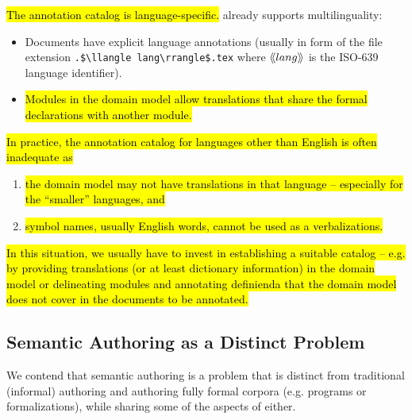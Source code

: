 \documentclass[runningheads]{llncs}
\def\edited#1{\hl{#1}}
\def\llangle{\langle\kern-.2em\langle}
\def\rrangle{\rangle\kern-.2em\rangle}
\begin{document}
\edited{The annotation catalog is language-specific.}
\sTeX already supports multilinguality:
\begin{itemize}
\item Documents have explicit language annotations (usually in form of the file extension
  \lstinline[mathescape]|.$\llangle lang\rrangle$.tex| where $\llangle lang\rrangle$ is the
  ISO-639 language identifier).
\item \edited{Modules in the domain model allow translations that share the formal
    declarations with another module.}
\end{itemize}
\edited{In practice, the annotation catalog for languages other than English is often inadequate as}
\begin{enumerate}[\em i\rm)]
    \item \edited{the domain model may not have translations in that language -- especially for the ``smaller'' languages, and}
    \item \edited{symbol names, usually English words, cannot be used as a verbalizations.}
\end{enumerate}
\edited{In this situation, we usually have to invest in
establishing a suitable catalog -- e.g. by providing translations (or at least dictionary
information) in the domain model or
delineating modules and annotating definienda that the
domain model does not cover in the documents to be annotated.
}

\subsection{Semantic Authoring as a Distinct Problem}
We contend that semantic authoring is a problem that is distinct from traditional
(informal) authoring and authoring fully formal corpora (e.g. programs or formalizations),
while sharing some of the aspects of either.
\end{document}
